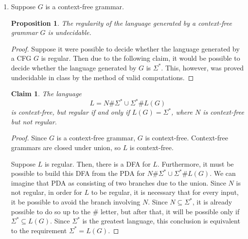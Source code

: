 \documentclass[letterpaper,11pt]{article}
\newtheorem{proposition}{Proposition}
\newtheorem{claim}{Claim}
\begin{document}
\begin{enumerate}
\begin{enumerate}
\begin{proof}
                    Since we can build a DFA for $L/w$ for any choice of $L$
                    and $w$ using operations under which regularity is closed,
                    $L/w$ is regular.
                \end{proof}

            \item
                Suppose $G$ is a context-free grammar.

                \begin{proposition}
                    The regularity of the language generated by a context-free
                    grammar $G$ is undecidable.
                \end{proposition}

                \begin{proof}
                    Suppose it were possible to decide whether the language
                    generated by a CFG $G$ is regular. Then due to the
                    following claim, it would be possible to decide whether the
                    language generated by $G$ is $\Sigma^*$. This, however, was
                    proved undecidable in class by the method of valid
                    computations.
                \end{proof}

                \begin{claim}
                    The language
                    $$L = N\#\Sigma^* \cup \Sigma^*\# L(G)$$
                    is context-free, but regular if and only if
                    $L(G) = \Sigma^*$, where $N$ is context-free but not
                    regular.
                \end{claim}

                \begin{proof}
                    Since $G$ is a context-free grammar, $G$ is context-free.
                    Context-free grammars are closed under union, so $L$ is
                    context-free.

                    Suppose $L$ is regular. Then, there is a DFA for $L$.
                    Furthermore, it must be possible to build this DFA from
                    the PDA for $N\#\Sigma^* \cup \Sigma^*\# L(G)$. We can
                    imagine that PDA as consisting of two branches due to
                    the union. Since $N$ is not regular, in order for $L$
                    to be regular, it is necessary that for every input, it
                    be possible to avoid the branch involving $N$. Since
                    $N \subseteq \Sigma^*$, it is already possible to do so
                    up to the $\#$ letter, but after that, it will be
                    possible only if $\Sigma^* \subseteq L(G)$. Since
                    $\Sigma^*$ is the greatest language, this conclusion is
                    equivalent to the requirement $\Sigma^* = L(G)$.


\end{proof}
\end{enumerate}
\end{enumerate}
\end{document}
